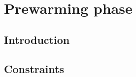 \section{Prewarming phase     \lispDone{}}      \label{hub: prewarming phase}
\subsection{Introduction      \lispDone{}}      \label{hub: prewarming phase: intro}                
\subsection{Constraints       \lispDone{}}      \label{hub: prewarming phase: constraints}          
